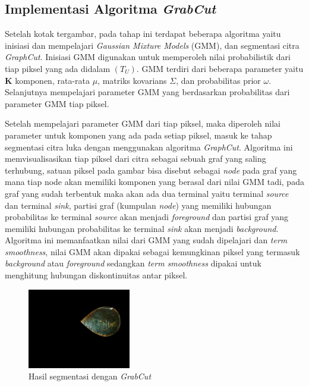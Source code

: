 \subsection{Implementasi Algoritma \emph{GrabCut}}
Setelah kotak tergambar, pada tahap ini terdapat beberapa algoritma yaitu inisiasi 
dan mempelajari \emph{Gaussian Mixture Models} (GMM), dan segmentasi citra \emph{GraphCut}. 
Inisiasi GMM digunakan untuk memperoleh nilai probabilistik dari tiap piksel yang ada
didalam \((T_{U})\). GMM terdiri dari beberapa parameter yaitu \textbf{K} komponen, 
rata-rata \(\mu\), matriks kovarians \(\Sigma\), dan probabilitas prior \(\omega\). 
Selanjutnya mempelajari parameter GMM yang berdasarkan probabilitas dari parameter 
GMM tiap piksel.

Setelah mempelajari parameter GMM dari tiap piksel, maka diperoleh nilai parameter
untuk komponen yang ada pada setiap piksel, masuk ke tahap segmentasi citra luka 
dengan menggunakan algoritma \emph{GraphCut}. Algoritma ini memvisualisasikan tiap piksel 
dari citra sebagai sebuah graf yang saling terhubung, satuan piksel pada gambar bisa
disebut sebagai \emph{node} pada graf yang mana tiap node akan memiliki komponen yang 
berasal dari nilai GMM tadi, pada graf yang sudah terbentuk maka akan ada dua terminal
yaitu terminal \emph{source} dan terminal \emph{sink}, partisi graf (kumpulan \emph{node}) 
yang memiliki hubungan probabilitas ke terminal \emph{source} akan menjadi \emph{foreground}
dan partisi graf yang memiliki hubungan probabilitas ke terminal \emph{sink} akan
menjadi \emph{background}. Algoritma ini memanfaatkan nilai dari GMM yang sudah dipelajari dan \emph{term smoothness}, nilai GMM akan dipakai sebagai
kemungkinan piksel yang termasuk \emph{background} atau \emph{foreground} sedangkan 
\emph{term smoothness} dipakai untuk menghitung hubungan diskontinuitas antar piksel.

\begin{figure}[H]
	\centering{}
	\includegraphics[width=0.4\textwidth]{gambar/res_2.png}
	\caption{Hasil segmentasi dengan \emph{GrabCut}}
  \end{figure}

